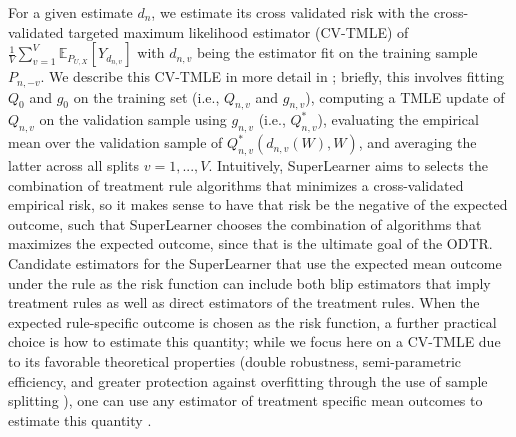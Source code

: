 \documentclass[a4paper,12pt]{article}
\begin{document}
\begin{enumerate}
For a given estimate $d_n$, we estimate its cross validated risk with the cross-validated targeted maximum likelihood estimator (CV-TMLE) of $\frac{1}{V}\sum_{v=1}^V\mathbb{E}_{P_{U,X}}[Y_{d_{n,v}}]$ with $d_{n,v}$ being the estimator fit on the training sample $P_{n,-v}$. We describe this CV-TMLE in more detail in \citep{montoyaplaceholder}; briefly, this involves fitting $Q_0$ and $g_0$ on the training set (i.e., $Q_{n,v}$ and $g_{n,v}$), computing a TMLE update of $Q_{n,v}$ on the validation sample using $g_{n,v}$ (i.e., $Q^*_{n,v}$), evaluating the empirical mean over the validation sample of $Q^*_{n,v}(d_{n,v}(W),W)$, and averaging the latter across all splits $v = 1,...,V$. 
Intuitively, SuperLearner aims to selects the combination of treatment rule algorithms that minimizes a cross-validated empirical risk, so it makes sense to have that risk be the negative of the expected outcome, such that SuperLearner chooses the combination of algorithms that maximizes the expected outcome, since that is the ultimate goal of the ODTR. Candidate estimators for the SuperLearner that use the expected mean outcome under the rule as the risk function can include both blip estimators that imply treatment rules as well as direct estimators of the treatment rules. When the expected rule-specific outcome is chosen as the risk function, a further practical choice is how to estimate this quantity; while we focus here on a CV-TMLE due to its favorable theoretical properties (double robustness, semi-parametric efficiency, and greater protection against overfitting through the use of sample splitting \citep{van2011targeted}), one can use any estimator of treatment specific mean outcomes to estimate this quantity \citep{bembomvdL2007practical, van2011targetedint, van2007causal}.


\end{enumerate}
\end{document}

